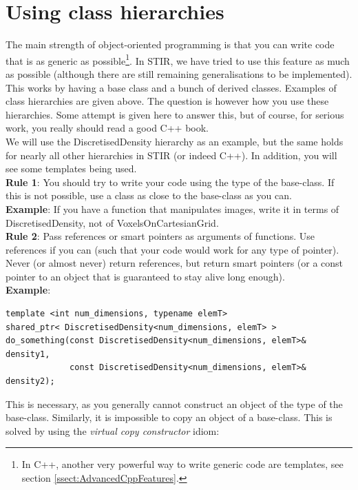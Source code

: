\documentclass{article}
\begin{document}
\section{
Using class hierarchies \label{sect:classhierarchies}}

The main strength of object-oriented programming is that you 
can write code that is as generic as possible\footnote{In C++, 
another very powerful way to write generic code are templates,
see section \ref{ssect:AdvancedCppFeatures}.}. In STIR, 
we have tried to use this feature as much as possible (although 
there are still remaining generalisations to be implemented). 
This works by having a base class and a bunch of derived classes. 
Examples of class hierarchies are given above. The question is 
however how you use these hierarchies. Some attempt is given 
here to answer this, but of course, for serious work, you really 
should read a good C++ book.\\
We will use the DiscretisedDensity hierarchy as an example, but 
the same holds for nearly all other hierarchies in STIR (or indeed 
C++). In addition, you will see some templates being used.\\
\textbf{Rule 1}: You should try to write your code using the type 
of the base-class. If this is not possible, use a class as close 
to the base-class as you can.\\
\textbf{Example}: If you have a function that manipulates images, 
write it in terms of DiscretisedDensity, not of VoxelsOnCartesianGrid.\\
\textbf{Rule 2}: Pass references or smart pointers as arguments of 
functions. Use references if you can (such that your code would 
work for any type of pointer). Never (or almost never) return 
references, but return smart pointers (or a const pointer to 
an object that is guaranteed to stay alive long enough).\\
\textbf{Example}:

\begin{verbatim}
template <int num_dimensions, typename elemT> 
shared_ptr< DiscretisedDensity<num_dimensions, elemT> >
do_something(const DiscretisedDensity<num_dimensions, elemT>& density1,
             const DiscretisedDensity<num_dimensions, elemT>& density2);
\end{verbatim}


This is necessary, as you generally cannot construct an object 
of the type of the base-class. Similarly, it is impossible to 
copy an object of a base-class. This is solved by using the \textit{virtual 
copy constructor} idiom:
\end{document}
